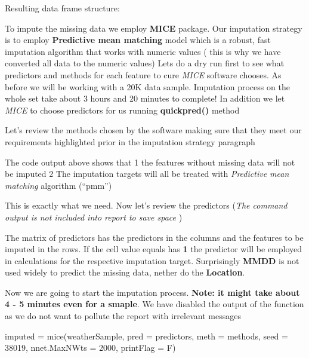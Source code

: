 Resulting data frame structure:

To impute the missing data we employ \textbf{MICE} package. Our
imputation strategy is to employ \textbf{Predictive mean matching} model
which is a robust, fast imputation algorithm that works with numeric
values ( this is why we have converted all data to the numeric values)
Lets do a dry run first to see what predictors and methods for each
feature to cure \emph{MICE} software chooses. As before we will be
working with a 20K data sample. Imputation process on the whole set take
about 3 hours and 20 minutes to complete! In addition we let \emph{MICE}
to choose predictors for us running \textbf{quickpred()} method

\begin{Schunk}
\end{Schunk}

Let's review the methods chosen by the software making sure that they
meet our requirements highlighted prior in the imputation strategy
paragraph

The code output above shows that 1 the features without missing data
will not be imputed 2 The imputation targets will all be treated with
\emph{Predictive mean matching} algorithm (``pmm'')

This is exactly what we need. Now let's review the predictors (\emph{The
command output is not included into report to save space })

The matrix of predictors has the predictors in the columns and the
features to be imputed in the rows. If the cell value equals has
\textbf{1} the predictor will be employed in calculations for the
respective imputation target. Surprisingly \textbf{MMDD} is not used
widely to predict the missing data, nether do the \textbf{Location}.

Now we are going to start the imputation process. \textbf{Note: it might
take about 4 - 5 minutes even for a smaple}. We have disabled the output
of the function as we do not want to pollute the report with irrelevant
messages

\begin{Schunk}
\begin{Sinput}
imputed = mice(weatherSample, pred = predictors, meth = methods, seed = 38019,
               nnet.MaxNWts = 2000, printFlag = F)
\end{Sinput}
\end{Schunk}

